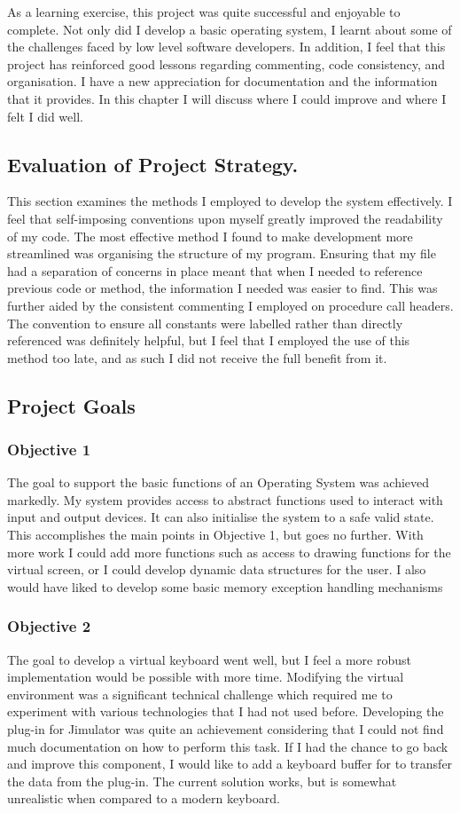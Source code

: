 As a learning exercise, this project was quite successful and enjoyable to complete. Not only did I develop a basic operating system, I learnt about some of the challenges faced by low level software developers. In addition, I feel that this project has reinforced good lessons regarding commenting, code consistency, and organisation. I have a new appreciation for documentation and the information that it provides. In this chapter I will discuss where I could improve and where I felt I did well. 


\subsection{Evaluation of Project Strategy.}
This section examines the methods I employed to develop the system effectively. I feel that self-imposing conventions upon myself greatly improved the readability of my code. The most effective method I found to make development more streamlined was organising the structure of my program. Ensuring that my file had a separation of concerns in place meant that when I needed to reference previous code or method, the information I needed was easier to find. This was further aided by the consistent commenting I employed on procedure call headers. The convention to ensure all constants were labelled rather than directly  referenced was definitely helpful, but I feel that I employed the use of this method too late, and as such I did not receive the full benefit from it. 


\subsection{Project Goals}
\subsubsection{Objective 1}
The goal to support the basic functions of an Operating System was achieved markedly. My system provides access to abstract functions used to interact with input and output devices. It can also initialise the system to a safe valid state. This accomplishes the main points in Objective 1, but goes no further. With more work I could add more functions such as access to drawing functions for the virtual screen, or I could develop dynamic data structures for the user. I also would have liked to develop some basic memory exception handling mechanisms
\subsubsection{Objective 2}
The goal to develop a virtual keyboard went well, but I feel a more robust implementation would be possible with more time. Modifying the virtual environment was a significant technical challenge which required me to experiment with various technologies that I had not used before. Developing the plug-in for Jimulator was quite an achievement considering that I could not find much documentation on how to perform this task. If I had the chance to go back and improve this component, I would like to add a keyboard buffer for to transfer the data from the plug-in. The current solution works, but is somewhat unrealistic when compared to a modern keyboard. 
